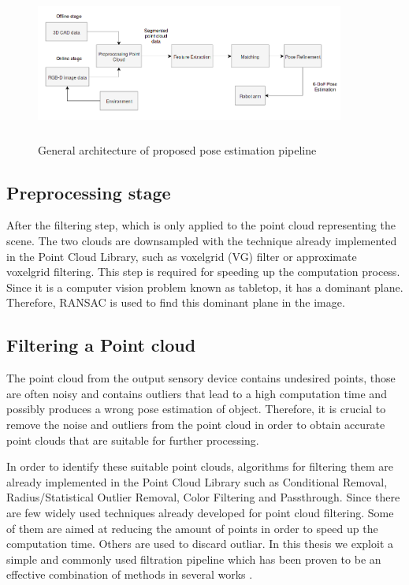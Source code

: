 \begin{figure}[!h]
\begin{center}
\includegraphics[width=4in,height=2in]{diagrams/wholesystem.png}
\caption{General architecture of proposed pose estimation pipeline}%
\label{fig:pipeline}
\end{center}
\end{figure}

\subsection{Preprocessing stage}

After the filtering step, which is only applied to the point cloud representing the scene. The two clouds are downsampled with the technique already implemented in the Point Cloud Library, such as voxelgrid (VG) filter or approximate voxelgrid filtering. This step is required for speeding up the computation process. 
Since it is a computer vision problem known as tabletop, it has a dominant plane. Therefore, RANSAC is used to find this dominant plane in the image. 

\subsection{Filtering a Point cloud}

The point cloud from the output sensory device contains undesired points, those are often noisy and contains outliers that lead to a high computation time and possibly produces a wrong pose estimation of object. Therefore, it is crucial to remove the noise and outliers from the point cloud in order to obtain accurate point clouds that are suitable for further processing. 

In order to identify these suitable point clouds, algorithms for filtering them are already implemented in the Point Cloud Library such as Conditional Removal, Radius/Statistical Outlier Removal, Color Filtering and Passthrough. 
Since there are few widely used techniques already developed for point cloud filtering. Some of them are aimed at reducing the amount of points in order to speed up the computation time. Others are used to discard outliar. In this thesis we exploit a simple and commonly used filtration pipeline which has been proven to be an effective combination of methods in several works \cite{algFiltering}.

